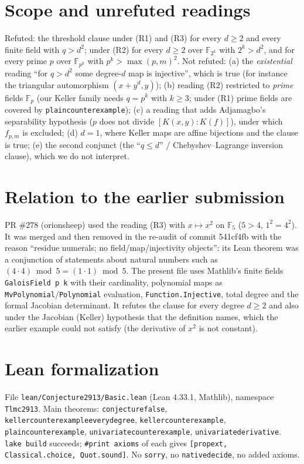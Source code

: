 \documentclass[11pt]{article}
\renewcommand{\_}{\oldus\allowbreak}
\theoremstyle{definition}
\theoremstyle{remark}
\newcommand{\F}{\mathbb{F}}
\begin{document}
\section{Scope and unrefuted readings}

Refuted: the threshold clause under (R1) and (R3) for every $d\ge2$ and every finite field with
$q>d^2$; under (R2) for every $d\ge2$ over $\F_{2^k}$ with $2^k>d^2$, and for every prime $p$ over
$\F_{p^k}$ with $p^k>\max(p,m)^2$. Not refuted:
(a) the \emph{existential} reading ``for $q>d^2$ some degree-$d$ map is injective'', which is true
(for instance the triangular automorphism $(x+y^d,y)$);
(b) reading (R2) restricted to \emph{prime} fields $\F_p$ (our Keller family needs $q=p^k$ with
$k\ge3$; under (R1) prime fields are covered by \texttt{plain\_counterexample});
(c) a reading that adds Adjamagbo's separability hypothesis ($p$ does not divide
$[K(x,y):K(f)]$), under which $f_{p,m}$ is excluded;
(d) $d=1$, where Keller maps are affine bijections and the clause is true;
(e) the second conjunct (the ``$q\le d$'' / Chebyshev--Lagrange inversion clause), which we do not
interpret.

\section{Relation to the earlier submission}

PR \#278 (orionsheep) used the reading (R3) with $x\mapsto x^2$ on $\F_5$ ($5>4$, $1^2=4^2$). It
was merged and then removed in the re-audit of commit 541cf4fb with the reason ``residue
numerals; no field/map/injectivity objects'': its Lean theorem was a conjunction of statements
about natural numbers such as $(4\cdot4)\bmod 5=(1\cdot1)\bmod5$. The present file uses Mathlib's
finite fields \texttt{GaloisField p k} with their cardinality, polynomial maps as
\texttt{MvPolynomial}/\texttt{Polynomial} evaluation, \texttt{Function.Injective}, total degree
and the formal Jacobian determinant. It refutes the clause for every degree $d\ge2$ and also under
the Jacobian (Keller) hypothesis that the definition names, which the earlier example could not
satisfy (the derivative of $x^2$ is not constant).

\section{Lean formalization}

File \texttt{lean/Conjecture2913/Basic.lean} (Lean 4.33.1, Mathlib), namespace
\texttt{Tlmc2913}. Main theorems: \texttt{conjecture\_00000002913\_false},
\texttt{keller\_counterexample\_every\_degree}, \texttt{keller\_counterexample},
\texttt{plain\_counterexample}, \texttt{univariate\_counterexample},
\texttt{univariate\_derivative}. \texttt{lake build} succeeds; \texttt{\#print axioms} of each gives
\texttt{[propext, Classical.choice, Quot.sound]}. No \texttt{sorry}, no \texttt{native\_decide}, no
added axioms.
\end{document}
